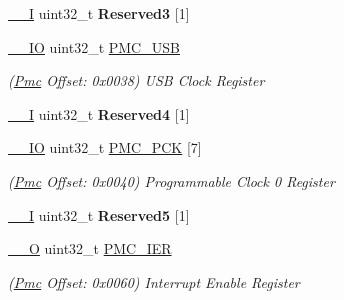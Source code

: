 \begin{DoxyCompactItemize}
\mbox{\label{structPmc_acecd1a576447012f3829909b50fbf0e1}} 
\mbox{\hyperlink{core__cm7_8h_af63697ed9952cc71e1225efe205f6cd3}{\+\_\+\+\_\+I}} uint32\+\_\+t {\bfseries Reserved3} \mbox{[}1\mbox{]}
\item 
\mbox{\label{structPmc_a3005725002bde064e2f7aa5b23c8c912}} 
\mbox{\hyperlink{core__cm7_8h_aec43007d9998a0a0e01faede4133d6be}{\+\_\+\+\_\+\+IO}} uint32\+\_\+t \mbox{\hyperlink{structPmc_a3005725002bde064e2f7aa5b23c8c912}{P\+M\+C\+\_\+\+U\+SB}}
\begin{DoxyCompactList}\small\item\em (\mbox{\hyperlink{structPmc}{Pmc}} Offset\+: 0x0038) U\+SB Clock Register \end{DoxyCompactList}\item 
\mbox{\label{structPmc_a186c0d803d2406382ce755eb17d2f42f}} 
\mbox{\hyperlink{core__cm7_8h_af63697ed9952cc71e1225efe205f6cd3}{\+\_\+\+\_\+I}} uint32\+\_\+t {\bfseries Reserved4} \mbox{[}1\mbox{]}
\item 
\mbox{\label{structPmc_a3832660383a9f2caa6ce861c33f39c30}} 
\mbox{\hyperlink{core__cm7_8h_aec43007d9998a0a0e01faede4133d6be}{\+\_\+\+\_\+\+IO}} uint32\+\_\+t \mbox{\hyperlink{structPmc_a3832660383a9f2caa6ce861c33f39c30}{P\+M\+C\+\_\+\+P\+CK}} \mbox{[}7\mbox{]}
\begin{DoxyCompactList}\small\item\em (\mbox{\hyperlink{structPmc}{Pmc}} Offset\+: 0x0040) Programmable Clock 0 Register \end{DoxyCompactList}\item 
\mbox{\label{structPmc_a0a569495b140daf4d1c4366d9c17c336}} 
\mbox{\hyperlink{core__cm7_8h_af63697ed9952cc71e1225efe205f6cd3}{\+\_\+\+\_\+I}} uint32\+\_\+t {\bfseries Reserved5} \mbox{[}1\mbox{]}
\item 
\mbox{\label{structPmc_a03b4c49ae0b1853dfcad21241f7f67bc}} 
\mbox{\hyperlink{core__cm7_8h_a7e25d9380f9ef903923964322e71f2f6}{\+\_\+\+\_\+O}} uint32\+\_\+t \mbox{\hyperlink{structPmc_a03b4c49ae0b1853dfcad21241f7f67bc}{P\+M\+C\+\_\+\+I\+ER}}
\begin{DoxyCompactList}\small\item\em (\mbox{\hyperlink{structPmc}{Pmc}} Offset\+: 0x0060) Interrupt Enable Register \end{DoxyCompactList}\item 

\end{DoxyCompactItemize}
